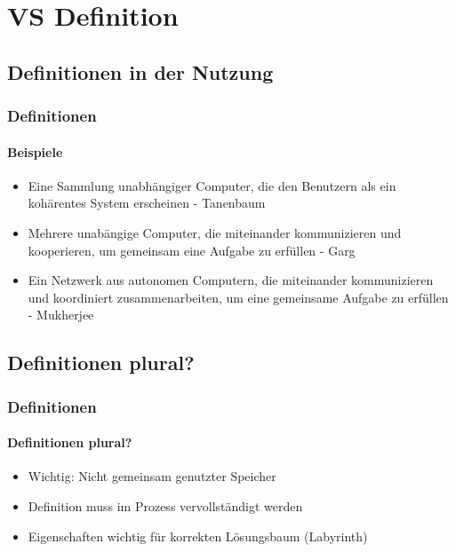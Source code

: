 \section{VS Definition}
\subsection{Definitionen in der Nutzung}
\begin{frame}
  \frametitle{Definitionen}
  \framesubtitle{Beispiele}
  \begin{itemize}
    \item Eine Sammlung unabhängiger Computer, die den Benutzern als ein kohärentes System erscheinen - Tanenbaum
    \item Mehrere unabängige Computer, die miteinander kommunizieren und kooperieren, um gemeinsam eine Aufgabe zu erfüllen - Garg
    \item Ein Netzwerk aus autonomen Computern, die miteinander kommunizieren und koordiniert zusammenarbeiten, um eine gemeinsame Aufgabe zu erfüllen - Mukherjee
  \end{itemize}
\end{frame}

\subsection{Definitionen plural?}
\begin{frame}
  \frametitle{Definitionen}
  \framesubtitle{Definitionen plural?}
  \begin{itemize}
    \item Wichtig: Nicht gemeinsam genutzter Speicher
    \item Definition muss im Prozess vervollständigt werden
    \item Eigenschaften wichtig für korrekten Lösungsbaum (Labyrinth)
  \end{itemize}
\end{frame}


